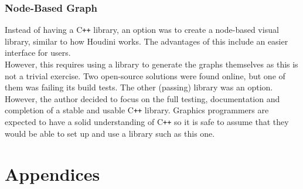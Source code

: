 \documentclass[12pt]{report}
\newcommand{\cpp}{C\texttt{++}}
\theoremstyle{definition}
\begin{document}
    \subsection{Node-Based Graph}

      Instead of having a \cpp{} library, an option was to create a node-based visual
      library, similar to how Houdini works. The advantages of this include an
      easier interface for users. \\

      However, this requires using a library to generate the graphs themselves
      as this is not a trivial exercise. Two open-source solutions were
      found online, but one of them was failing its build tests. The
      other (passing) library was an option. However, the author
      decided to focus on the full testing, documentation and
      completion of a stable and usable \cpp{} library. Graphics
      programmers are expected to have a solid understanding
      of \cpp{} so it is safe to assume that they would be able
      to set up and use a library such as this one.

  
  

  \chapter*{Appendices}
\end{document}
